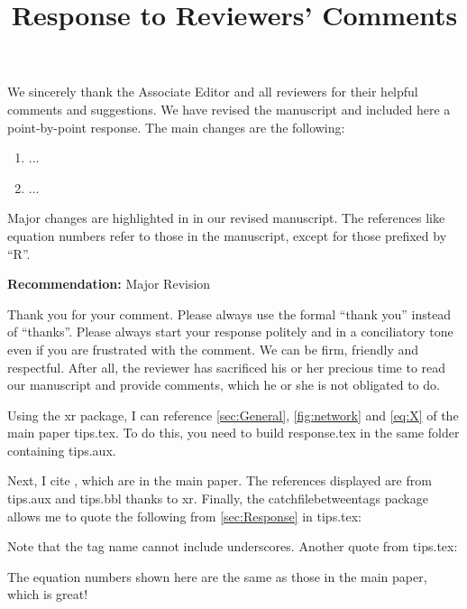 \documentclass[11pt, onecolumn, final]{IEEEtran}
\title{Response to Reviewers' Comments}
\def\docprefix{R} %
\begin{document}
\maketitle


We sincerely thank the Associate Editor and all reviewers for their helpful comments and suggestions. We have revised the manuscript and included here a point-by-point response. The main changes are the following:
\begin{enumerate}
  \item ...
  \item ...
\end{enumerate}
\medskip

Major changes are highlighted in  in our revised manuscript. The references like equation numbers refer to those in the manuscript, except for those prefixed by ``\docprefix''. 


\PbPResponseHeader

\noindent\textbf{Recommendation:} Major Revision

\begin{response}
  Thank you for your comment. Please always use the formal ``thank you'' instead of ``thanks''. Please always start your response politely and in a conciliatory tone even if you are frustrated with the comment. We can be firm, friendly and respectful. After all, the reviewer has sacrificed his or her precious time to read our manuscript and provide comments, which he or she is not obligated to do.

  Using the xr package, I can reference \cref{sec:General}, \cref{fig:network} and \cref{eq:X} of the main paper tips.tex. To do this, you need to build response.tex in the same folder containing tips.aux. 

  Next, I cite \cite{LenTayQui:J16,Str:93}, which are in the main paper. The references displayed are from tips.aux and tips.bbl thanks to xr. Finally, the catchfilebetweentags package allows me to quote the following from \cref{sec:Response} in tips.tex:

  Note that the tag name cannot include underscores. Another quote from tips.tex:

  The equation numbers shown here are the same as those in the main paper, which is great!
\end{response}
\end{document}
